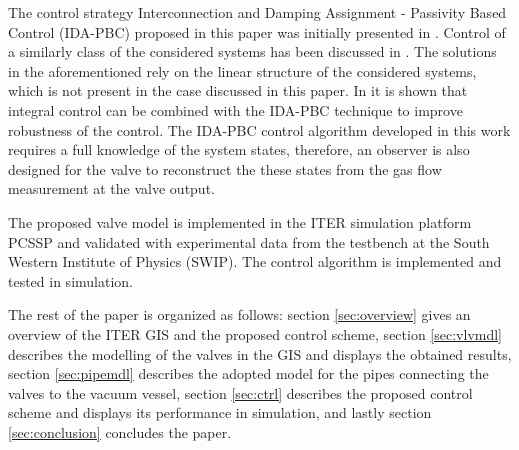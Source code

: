 \documentclass[letterpaper, 10pt, conference]{ieeeconf}
\begin{document}
The control strategy Interconnection and Damping Assignment - Passivity Based Control (IDA-PBC) proposed in this paper was initially presented in \cite{IDAPBC}. Control of a similarly class of the considered systems has been discussed in \cite{PHintro, weakcouple}. The solutions in the aforementioned rely on the linear structure of the considered systems, which is not present in the case discussed in this paper. In \cite{integralIDA} it is shown that integral control can be combined with the IDA-PBC technique to improve robustness of the control. 
The IDA-PBC control algorithm developed in this work requires a full knowledge of the system states, therefore, an observer is also designed for the valve to reconstruct the these states from the gas flow measurement at the valve output.

The proposed valve model is implemented in the ITER simulation platform PCSSP \cite{Ravensbergen2023} and validated with experimental data from the testbench at the South Western Institute of Physics (SWIP). The control algorithm is implemented and tested in simulation.
 
The rest of the paper is organized as follows: section \ref{sec:overview} gives an overview of the ITER GIS and the proposed control scheme, section \ref{sec:vlvmdl} describes the modelling of the valves in the GIS and displays the obtained results, section \ref{sec:pipemdl} describes the adopted model for the pipes connecting the valves to the vacuum vessel, section \ref{sec:ctrl} describes the proposed control scheme and displays its performance in simulation, and lastly section \ref{sec:conclusion} concludes the paper.
\end{document}
